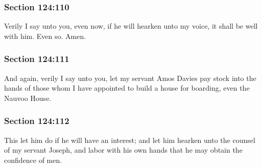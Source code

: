	\subsubsection{Section 124:110} %
		\label{DC124-110}

		Verily I say unto you, even now, if he will hearken unto my voice, it shall be well with him.  Even so.  Amen.


	\subsubsection{Section 124:111} %
		\label{DC124-111}

		And again, verily I say unto you, let my servant Amos Davies pay stock into the hands of those whom I have appointed to build a house for boarding, even the Nauvoo House.


	\subsubsection{Section 124:112} %
		\label{DC124-112}

		This let him do if he will have an interest; and let him hearken unto the counsel of my servant Joseph, and labor with his own hands that he may obtain the confidence of men.


